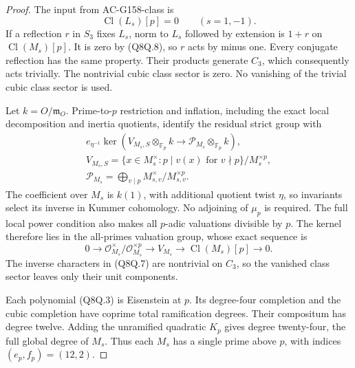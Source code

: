 \begin{proof}
The input from AC-G158-class is
\[
                            \operatorname{Cl}(L_s)[p]=0
                    \qquad(s=1,-1).
 \tag{Q8Q.8}
\]
If a reflection $r$ in $S_3$ fixes $L_s$, norm to $L_s$
followed by extension is $1+r$ on $\operatorname{Cl}(M_s)[p]$.
It is zero by (Q8Q.8), so $r$ acts by minus one.
Every conjugate reflection has the same property.
Their products generate $C_3$, which consequently acts trivially.
The nontrivial cubic class sector is zero.
No vanishing of the trivial cubic class sector is used.

Let $k=O/\mathfrak m_O$.
Prime-to-$p$ restriction and inflation, including the exact
local decomposition and inertia quotients, identify the residual
strict group with
\[
 \begin{gathered}
 e_{\eta^{-1}}\ker\left(V_{M_s,S}\otimes_{\mathbb F_p}k
             \longrightarrow\mathcal P_{M_s}\otimes_{\mathbb F_p}k\right),\\
 V_{M_s,S}=\{x\in M_s^\times:p\mid v(x)\text{ for }v\nmid p\}/M_s^{\times p},\\
 \mathcal P_{M_s}=\bigoplus_{v\mid p}M_{s,v}^\times/M_{s,v}^{\times p}.
 \end{gathered}
 \tag{Q8Q.9}
\]
The coefficient over $M_s$ is $k(1)$, with additional quotient
twist $\eta$, so invariants select its inverse in Kummer cohomology.
No adjoining of $\mu_p$ is required.
The full local power condition also makes all $p$-adic valuations
divisible by $p$.
The kernel therefore lies in the all-primes valuation group,
whose exact sequence is
\[
 0\longrightarrow\mathcal O_{M_s}^{\times}/\mathcal O_{M_s}^{\times p}
 \longrightarrow V_{M_s}\longrightarrow\operatorname{Cl}(M_s)[p]
 \longrightarrow0.
 \tag{Q8Q.10}
\]
The inverse characters in (Q8Q.7) are nontrivial on $C_3$,
so the vanished class sector leaves only their unit components.

Each polynomial (Q8Q.3) is Eisenstein at $p$.
Its degree-four completion and the cubic completion have coprime
total ramification degrees.  Their compositum has degree twelve.
Adding the unramified quadratic $K_p$ gives degree twenty-four,
the full global degree of $M_s$.
Thus each $M_s$ has a single prime above $p$, with indices
$(e_p,f_p)=(12,2)$.


\end{proof}
